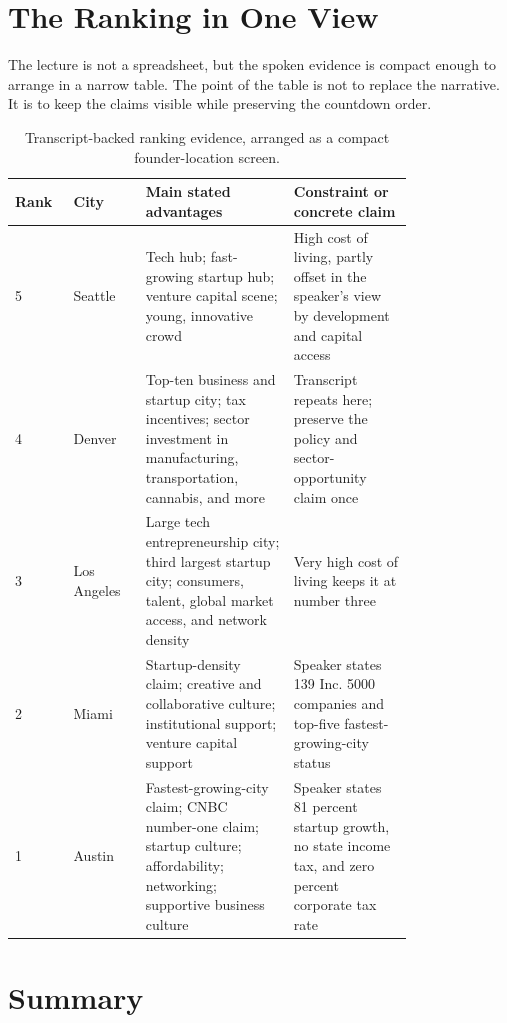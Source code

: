 \section{The Ranking in One View}

The lecture is not a spreadsheet, but the spoken evidence is compact enough to arrange in a narrow table. The point of the table is not to replace the narrative. It is to keep the claims visible while preserving the countdown order.

\begin{table}
\centering
\begingroup
\small
\setlength{\tabcolsep}{3pt}
\begin{tabular}{p{0.09\linewidth}|p{0.14\linewidth}|p{0.31\linewidth}|p{0.25\linewidth}}
Rank & City & Main stated advantages & Constraint or concrete claim \\
\hline
5 & Seattle &
Tech hub; fast-growing startup hub; venture capital scene; young, innovative crowd &
High cost of living, partly offset in the speaker's view by development and capital access \\
\hline
4 & Denver &
Top-ten business and startup city; tax incentives; sector investment in manufacturing, transportation, cannabis, and more &
Transcript repeats here; preserve the policy and sector-opportunity claim once \\
\hline
3 & Los Angeles &
Large tech entrepreneurship city; third largest startup city; consumers, talent, global market access, and network density &
Very high cost of living keeps it at number three \\
\hline
2 & Miami &
Startup-density claim; creative and collaborative culture; institutional support; venture capital support &
Speaker states 139 Inc. 5000 companies and top-five fastest-growing-city status \\
\hline
1 & Austin &
Fastest-growing-city claim; CNBC number-one claim; startup culture; affordability; networking; supportive business culture &
Speaker states 81 percent startup growth, no state income tax, and zero percent corporate tax rate \\
\end{tabular}
\endgroup
\caption{Transcript-backed ranking evidence, arranged as a compact founder-location screen.}
\end{table}

\section{Summary}

